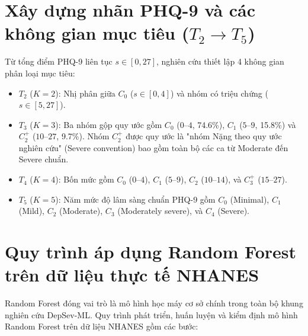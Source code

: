 \section{Xây dựng nhãn PHQ-9 và các không gian mục tiêu ($T_2 \to T_5$)}
\label{sec:nhan-muc-tieu}

Từ tổng điểm PHQ-9 liên tục $s \in [0, 27]$, nghiên cứu thiết lập 4 không gian phân loại mục tiêu:
\begin{itemize}
    \item $T_2$ ($K=2$): Nhị phân giữa $C_0$ ($s \in [0, 4]$) và nhóm có triệu chứng ($s \in [5, 27]$).
    \item $T_3$ ($K=3$): Ba nhóm gộp quy ước gồm $C_0$ ($0$--$4$, 74.6\%), $C_1$ ($5$--$9$, 15.8\%) và $C_2^+$ ($10$--$27$, 9.7\%). Nhóm $C_2^+$ được quy ước là "nhóm Nặng theo quy ước nghiên cứu" (Severe convention) bao gồm toàn bộ các ca từ Moderate đến Severe chuẩn.
    \item $T_4$ ($K=4$): Bốn mức gồm $C_0$ ($0$--$4$), $C_1$ ($5$--$9$), $C_2$ ($10$--$14$), và $C_3^+$ ($15$--$27$).
    \item $T_5$ ($K=5$): Năm mức độ lâm sàng chuẩn PHQ-9 gồm $C_0$ (Minimal), $C_1$ (Mild), $C_2$ (Moderate), $C_3$ (Moderately severe), và $C_4$ (Severe).
\end{itemize}

\section{Quy trình áp dụng Random Forest trên dữ liệu thực tế NHANES}
\label{sec:xay-dung-random-forest}

Random Forest đóng vai trò là mô hình học máy cơ sở chính trong toàn bộ khung nghiên cứu DepSev-ML. Quy trình phát triển, huấn luyện và kiểm định mô hình Random Forest trên dữ liệu NHANES gồm các bước:

